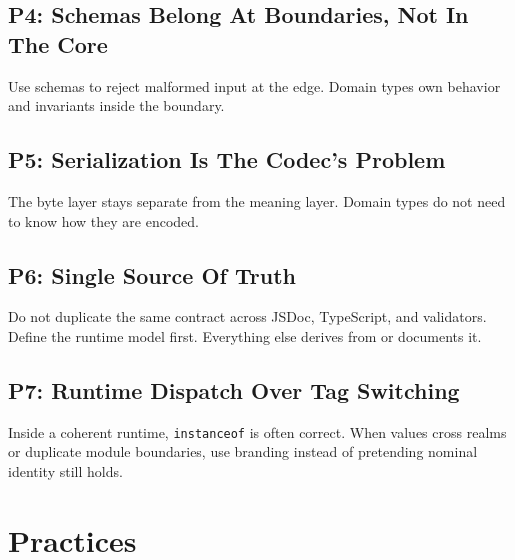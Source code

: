\subsection{P4: Schemas Belong At Boundaries, Not In The Core}\label{record-060-p4-schemas-belong-at-boundaries-not-in-the-core}

Use schemas to reject malformed input at the edge. Domain types own behavior and invariants inside the boundary.

\subsection{P5: Serialization Is The Codec's Problem}\label{record-060-p5-serialization-is-the-codecs-problem}

The byte layer stays separate from the meaning layer. Domain types do not need to know how they are encoded.

\subsection{P6: Single Source Of Truth}\label{record-060-p6-single-source-of-truth}

Do not duplicate the same contract across JSDoc, TypeScript, and validators. Define the runtime model first. Everything else derives from or documents it.

\subsection{P7: Runtime Dispatch Over Tag Switching}\label{record-060-p7-runtime-dispatch-over-tag-switching}

Inside a coherent runtime, \texttt{i\allowbreak{}n\allowbreak{}s\allowbreak{}t\allowbreak{}a\allowbreak{}n\allowbreak{}c\allowbreak{}e\allowbreak{}o\allowbreak{}f} is often correct. When values cross realms or duplicate module boundaries, use branding instead of pretending nominal identity still holds.

\section{Practices}\label{record-060-practices}

